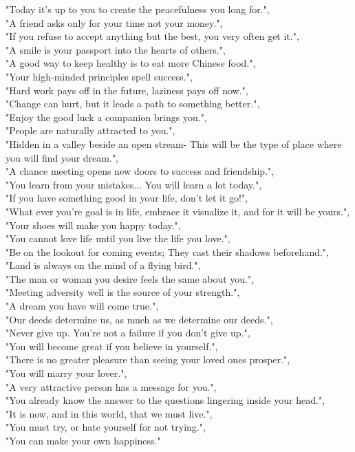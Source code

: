 \documentclass[titlepage,a4paper,10pt]{article}
\begin{document}
"Today it's up to you to create the peacefulness you long for.", \\
"A friend asks only for your time not your money.", \\
"If you refuse to accept anything but the best, you very often get it.",\\
"A smile is your passport into the hearts of others.",\\
"A good way to keep healthy is to eat more Chinese food.",\\
"Your high-minded principles spell success.",\\
"Hard work pays off in the future, laziness pays off now.",\\
"Change can hurt, but it leads a path to something better.",\\
"Enjoy the good luck a companion brings you.",\\
"People are naturally attracted to you.",\\
"Hidden in a valley beside an open stream- This will be the type of place where you will find your dream.",\\
"A chance meeting opens new doors to success and friendship.",\\
"You learn from your mistakes... You will learn a lot today.",\\
"If you have something good in your life, don't let it go!",\\
"What ever you're goal is in life, embrace it visualize it, and for it will be yours.",\\
"Your shoes will make you happy today.",\\
"You cannot love life until you live the life you love.",\\
"Be on the lookout for coming events; They cast their shadows beforehand.",\\
"Land is always on the mind of a flying bird.",\\
"The man or woman you desire feels the same about you.",\\
"Meeting adversity well is the source of your strength.",\\
"A dream you have will come true.",\\
"Our deeds determine us, as much as we determine our deeds.",\\
"Never give up. You're not a failure if you don't give up.",\\
"You will become great if you believe in yourself.",\\
"There is no greater pleasure than seeing your loved ones prosper.",\\
"You will marry your lover.",\\
"A very attractive person has a message for you.",\\
"You already know the answer to the questions lingering inside your head.",\\
"It is now, and in this world, that we must live.",\\
"You must try, or hate yourself for not trying.",\\
"You can make your own happiness."

\newpage
\printbibliography[heading=bibintoc, resetnumbers=true]
\end{document}
